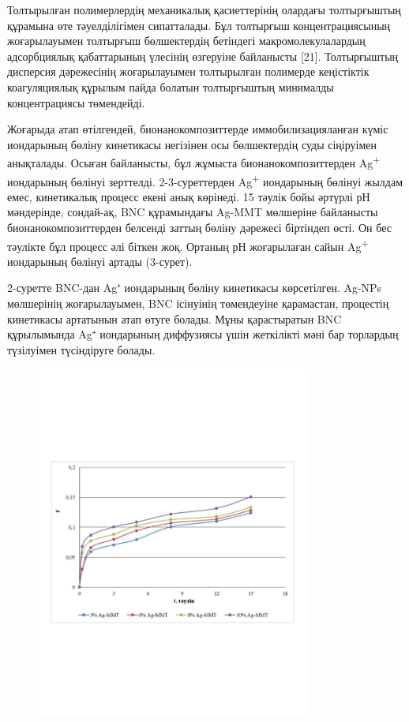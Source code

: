 Толтырылған полимерлердің механикалық қасиеттерінің олардағы
толтырғыштың құрамына өте тәуелділігімен сипатталады. Бұл толтырғыш
концентрациясының жоғарылауымен толтырғыш бөлшектердің бетіндегі
макромолекулалардың адсорбциялық қабаттарының үлесінің өзгеруіне
байланысты {[}21{]}. Толтырғыштың дисперсия дәрежесінің жоғарылауымен
толтырылған полимерде кеңістіктік коагуляциялық құрылым пайда болатын
толтырғыштың минималды концентрациясы төмендейді.

Жоғарыда атап өтілгендей, бионанокомпозиттерде иммобилизацияланған күміс
иондарының бөліну кинетикасы негізінен осы бөлшектердің суды сіңіруімен
анықталады. Осыған байланысты, бұл жұмыста бионанокомпозиттерден
Ag\textsuperscript{+} иондарының бөлінуі зерттелді. 2-3-суреттерден
Ag\textsuperscript{+} иондарының бөлінуі жылдам емес, кинетикалық
процесс екені анық көрінеді. 15 тәулік бойы әртүрлі рН мәндерінде,
сондай-ақ, BNC құрамындағы Ag-MMT мөлшеріне байланысты
бионанокомпозиттерден белсенді заттың бөліну дәрежесі біртіндеп өсті. Он
бес тәулікте бұл процесс әлі біткен жоқ. Ортаның рН жоғарылаған сайын
Ag\textsuperscript{+} иондарының бөлінуі артады (3-сурет).

2-суретте BNC-дан Ag⁺ иондарының бөліну кинетикасы көрсетілген. Ag-NPs
мөлшерінің жоғарылауымен, BNC ісінуінің төмендеуіне қарамастан,
процестің кинетикасы артатынын атап өтуге болады. Мұны қарастыратын BNC
құрылымында Ag⁺ иондарының диффузиясы үшін жеткілікті мәні бар торлардың
түзілуімен түсіндіруге болады.

\begin{figure}[H]
	\centering
	\includegraphics[width=0.8\textwidth]{media/chem/image15}
	\caption*{}
\end{figure}


